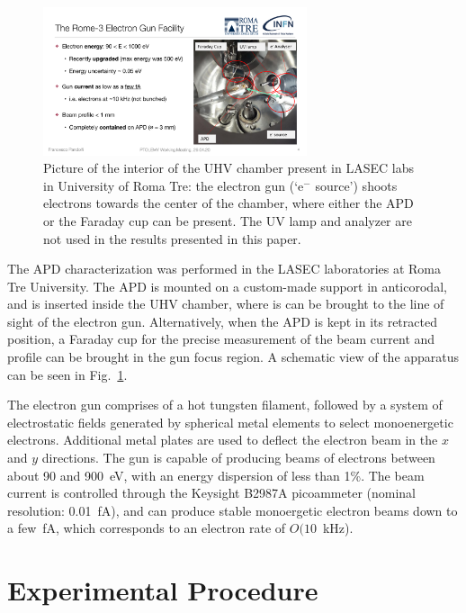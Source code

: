 \documentclass[12p]{paper}
\begin{document}
\begin{figure}[tb]
  \centering
\includegraphics[width=0.69\textwidth]{figures/chamber_photo}
 \caption{Picture of the interior of the UHV chamber present in LASEC labs in University of Roma Tre: the electron gun (`e$^{-}$ source') shoots electrons towards the center of the chamber, where either the APD or the Faraday cup can be present. The UV lamp and analyzer are not used in the results presented in this paper.
  \label{fig:gun}}
\end{figure}


The APD characterization was performed in the LASEC laboratories at Roma Tre University. The APD is mounted on a custom-made support in anticorodal, and is inserted inside the UHV chamber, where is can be brought to the line of sight of the electron gun. Alternatively, when the APD is kept in its retracted position, a Faraday cup for the precise measurement of the beam current and profile can be brought in the gun focus region. A schematic view of the apparatus can be seen in Fig.~\ref{fig:gun}.

The electron gun comprises of a hot tungsten filament, followed by a system of electrostatic fields generated by spherical metal elements to select monoenergetic electrons. Additional metal plates are used to deflect the electron beam in the $x$ and $y$ directions. The gun is capable of producing beams of electrons between about 90 and 900~eV, with an energy dispersion of less than 1\%. The beam current is controlled through the Keysight B2987A picoammeter (nominal resolution: 0.01~fA), and can produce stable monoergetic electron beams down to a few~fA, which corresponds to an electron rate of $O(10$~kHz).


\section{Experimental Procedure}
\end{document}
